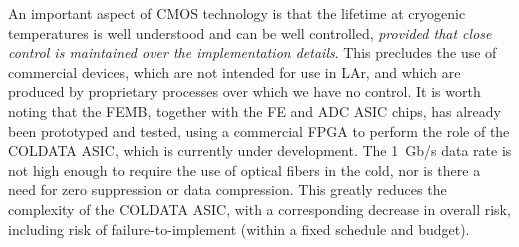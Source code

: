 An important aspect of CMOS technology is that the lifetime at cryogenic temperatures is well understood and can be
well controlled, {\em provided that close control is maintained over the implementation details}.
This precludes the use of commercial devices, which are not intended for use in LAr,
and which are produced by proprietary processes over which we have no control.
It is worth noting that the FEMB, together with the FE and ADC ASIC chips, has already been prototyped and tested,
using a commercial FPGA to perform the role of the COLDATA ASIC,
which is currently under development.
The 1~Gb/s data rate is not high enough to require the use of optical fibers in the cold,
nor is there a need for zero suppression or data compression.
This greatly reduces the complexity of the COLDATA ASIC, with a corresponding decrease in overall risk,
including risk of failure-to-implement (within a fixed schedule and budget).

